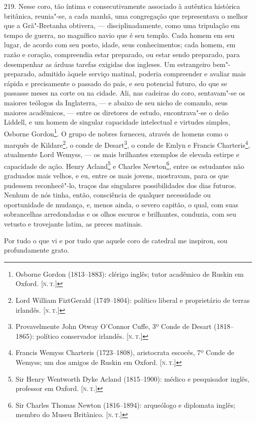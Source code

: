 219. Nesse coro, tão íntima e consecutivamente associado à autêntica
histórica britânica, reunia"-se, a cada manhã, uma congregação que
representava o melhor que a Grã"-Bretanha obtivera, --- disciplinadamente,
como uma tripulação em tempo de guerra, no magnífico navio que é seu
templo. Cada homem em seu lugar, de acordo com seu posto, idade, seus
conhecimentos; cada homem, em razão e coração, compreendia estar
preparado, ou estar sendo preparado, para desempenhar as árduas tarefas
exigidas dos ingleses. Um estrangeiro bem"-preparado, admitido àquele
serviço matinal, poderia compreender e avaliar mais rápida e
precisamente o passado do país, e seu potencial futuro, do que se
passasse meses na corte ou na cidade. Ali, nas cadeiras do coro,
sentavam"-se os maiores teólogos da Inglaterra, --- e abaixo de seu nicho
de comando, seus maiores acadêmicos, --- entre os diretores de estudo,
encontrava"-se o deão Liddell, e um homem de singular capacidade
intelectual e virtudes simples, Osborne Gordon\footnote{Osborne Gordon
  (1813--1883): clérigo inglês; tutor acadêmico de Ruskin em Oxford. {[}\textsc{n.\,t.}{]}}. O grupo de nobres forneceu, através de homens como o
marquês de Kildare\footnote{Lord William FiztGerald (1749--1804):
  político liberal e proprietário de terras irlandês. {[}\textsc{n.\,t.}{]}}, o
conde de Desart\footnote{Provavelmente John Otway O'Connor Cuffe, 3º
  Conde de Desart (1818--1865): político conservador irlandês. {[}\textsc{n.\,t.}{]}}, o conde de Emlyn e Francis Charteris\footnote{Francis Wemyss
  Charteris (1723--1808), aristocrata escocês, 7º Conde de Wemyss; um dos
  amigos de Ruskin em Oxford. {[}\textsc{n.\,t.}{]}}, atualmente Lord Wemyss,
--- os mais brilhantes exemplos de elevada estirpe e capacidade de ação.
Henry Acland\footnote{Sir Henry Wentworth Dyke Acland (1815--1900):
  médico e pesquisador inglês, professor em Oxford. {[}\textsc{n.\,t.}{]}} e
Charles Newton\footnote{Sir Charles Thomas Newton (1816--1894):
  arqueólogo e diplomata inglês; membro do Museu Britânico. {[}\textsc{n.\,t.}{]}}, entre os estudantes não graduados mais velhos, e eu, entre os
mais jovens, mostravam, para os que pudessem reconhecê"-lo, traços das
singulares possibilidades dos dias futuros. Nenhum de nós tinha, então,
consciência de qualquer necessidade ou oportunidade de mudança, e, menos
ainda, o severo capitão, o qual, com suas sobrancelhas arredondadas e os
olhos escuros e brilhantes, conduzia, com seu vetusto e trovejante
latim, as preces matinais.

Por tudo o que vi e por tudo que aquele coro de catedral me inspirou,
sou profundamente grato.

